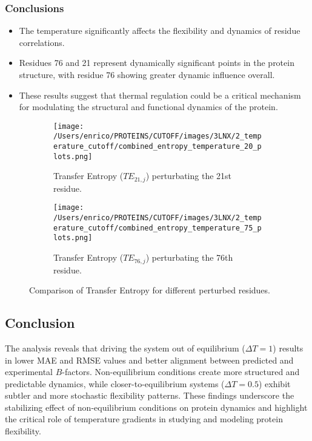\documentclass[English, Lau, oneside]{sapthesis}
\begin{document}
\subsubsection{Conclusions}
\begin{itemize}
    \item The temperature significantly affects the flexibility and dynamics of residue correlations.
    \item Residues 76 and 21 represent dynamically significant points in the protein structure, with residue 76 showing greater dynamic influence overall.
    \item These results suggest that thermal regulation could be a critical mechanism for modulating the structural and functional dynamics of the protein.
\end{itemize}









\newpage
\newpage


\begin{figure}[htbp]
    \centering
    \begin{subfigure}[t]{0.45\textwidth}
        \centering
        \texttt{[image: /Users/enrico/PROTEINS/CUTOFF/images/3LNX/2\_temperature\_cutoff/combined\_entropy\_temperature\_20\_plots.png]}
        \caption{Transfer Entropy ($TE_{21,j}$) perturbating the 21st residue.}
        \label{fig:TE21_i_j_out}
    \end{subfigure}
    \hfill
    \begin{subfigure}[t]{0.45\textwidth}
        \centering
        \texttt{[image: /Users/enrico/PROTEINS/CUTOFF/images/3LNX/2\_temperature\_cutoff/combined\_entropy\_temperature\_75\_plots.png]}
        \caption{Transfer Entropy ($TE_{76,j}$) perturbating the 76th residue.}
        \label{fig:TE76_i_j_out}
    \end{subfigure}
    \caption{Comparison of Transfer Entropy for different perturbed residues.}
    \label{fig:TE_comparison_i_j_out}
\end{figure}


\subsection{Conclusion}
The analysis reveals that driving the system out of equilibrium (\(\Delta T = 1\)) results in lower MAE and RMSE values and better alignment between predicted and experimental \( B \)-factors. Non-equilibrium conditions create more structured and predictable dynamics, while closer-to-equilibrium systems (\(\Delta T = 0.5\)) exhibit subtler and more stochastic flexibility patterns. These findings underscore the stabilizing effect of non-equilibrium conditions on protein dynamics and highlight the critical role of temperature gradients in studying and modeling protein flexibility.
\end{document}
